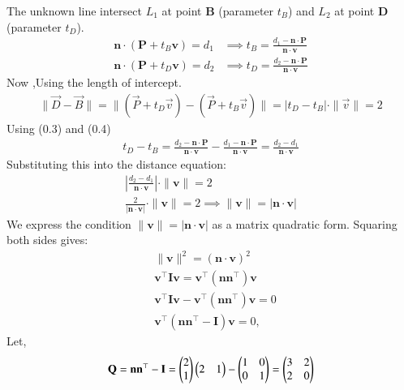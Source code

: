 \documentclass[journal]{IEEEtran}
\begin{document}
The unknown line intersect $L_1$ at point $\mathbf{B}$ (parameter $t_B$) and $L_2$ at point $\mathbf{D}$ (parameter $t_D$).
\begin{align}
	\mathbf{n} \cdot (\mathbf{P} + t_B \mathbf{v}) = d_1 &\implies t_B = \frac{d_1 - \mathbf{n} \cdot \mathbf{P}}{\mathbf{n} \cdot \mathbf{v}} \\
	\mathbf{n} \cdot (\mathbf{P} + t_D \mathbf{v}) = d_2 &\implies t_D = \frac{d_2 - \mathbf{n} \cdot \mathbf{P}}{\mathbf{n} \cdot \mathbf{v}}
\end{align}
Now ,Using the length of intercept.\\
\begin{align}
\|\vec{D} - \vec{B}\| = \|(\vec{P} + t_D \vec{v}) - (\vec{P} + t_B \vec{v})\| = |t_D - t_B| \cdot \|\vec{v}\| = 2
\end{align} 
Using (0.3) and (0.4)\\
\begin{align}
t_D - t_B = \frac{d_2 - \mathbf{n} \cdot \mathbf{P}}{\mathbf{n} \cdot \mathbf{v}} - \frac{d_1 - \mathbf{n} \cdot \mathbf{P}}{\mathbf{n} \cdot \mathbf{v}} = \frac{d_2 - d_1}{\mathbf{n} \cdot \mathbf{v}}
\end{align}
Substituting this into the distance equation:
\begin{align}
\left| \frac{d_2 - d_1}{\mathbf{n} \cdot \mathbf{v}} \right| \cdot \|\mathbf{v}\| = 2 \\
\frac{2}{|\mathbf{n} \cdot \mathbf{v}|} \cdot \|\mathbf{v}\| = 2 \implies \|\mathbf{v}\| = |\mathbf{n} \cdot \mathbf{v}| 
\end{align}
We express the condition $\|\mathbf{v}\| = |\mathbf{n} \cdot \mathbf{v}|$ as a matrix quadratic form. Squaring both sides gives:
\begin{align} 
&\|\mathbf{v}\|^2 = (\mathbf{n} \cdot \mathbf{v})^2 \\
&\mathbf{v}^\top\mathbf{I}\mathbf{v} = \mathbf{v}^\top(\mathbf{n}\mathbf{n}^\top)\mathbf{v} \\
&\mathbf{v}^\top\mathbf{I}\mathbf{v} - \mathbf{v}^\top(\mathbf{n}\mathbf{n}^\top)\mathbf{v} = 0\\
&\mathbf{v}^\top (\mathbf{n}\mathbf{n}^\top - \mathbf{I}) \mathbf{v} = 0, 
\end{align}
Let,
\begin{align}
\mathbf{Q} = \mathbf{n}\mathbf{n}^\top - \mathbf{I} = \begin{pmatrix}2 \\ 1\end{pmatrix} \begin{pmatrix}2 & 1\end{pmatrix} - \begin{pmatrix}1 & 0 \\ 0 & 1\end{pmatrix} = \begin{pmatrix}3 & 2 \\ 2 & 0\end{pmatrix} 
\end{align}
\end{document}
